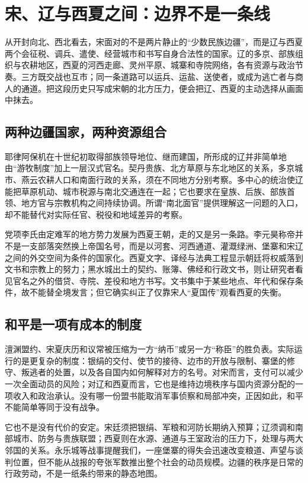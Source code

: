 \section{宋、辽与西夏之间：边界不是一条线}

从开封向北、西北看去，宋面对的不是两片静止的“少数民族边疆”，而是辽与西夏两个会征税、调兵、遣使、经营城市和书写自身合法性的国家。辽的多京、部族组织与农耕地区，西夏的河西走廊、灵州平原、城寨和寺院网络，各有资源与政治节奏。三方既交战也互市；同一条道路可以运兵、运盐、送使者，或成为逃亡者与商人的通道。把这段历史只写成宋朝的北方压力，便会把辽、西夏的主动选择从画面中抹去。

\subsection{两种边疆国家，两种资源组合}

耶律阿保机在十世纪初取得部族领导地位、继而建国，所形成的辽并非简单地由“游牧制度”加上一层汉式官名。契丹贵族、北方草原与东北地区的关系，多京城市、燕云农耕人口和南面行政的关系，须在不同地方分别考察。多中心的统治使辽能把草原机动、城市税源与南北交通连在一起；它也要求在皇族、后族、部族首领、地方官与宗教机构之间持续协调。所谓“南北面官”提供理解这一问题的入口，却不能替代对实际任官、税役和地域差异的考察。

党项李氏由定难军的地方势力发展为西夏王朝，走的又是另一条路。李元昊称帝并不是一支部落突然换上帝国名号，而是以河套、河西通道、灌溉绿洲、堡寨和宋辽之间的外交空间为条件的国家化。西夏文字、译经与法典工程显示朝廷将权威落到文书和宗教上的努力；黑水城出土的契约、账簿、佛经和行政文书，则让研究者看见官名之外的借贷、寺院、差役和地方书写。文书集中于某些地点、年代和保存条件，故不能替全境发言；但它确实纠正了仅靠宋人“夏国传”观看西夏的失衡。

\subsection{和平是一项有成本的制度}

澶渊盟约、宋夏庆历和议常被压缩为一方“纳币”或另一方“称臣”的胜负表。实际运行的是更复杂的制度：银绢的交付、使节的接待、边市的开放与限制、寨堡的修守、叛逃者的处置，以及各自国内如何解释对方的名号。对宋而言，支付可以减少一次全面动员的风险；对辽和西夏而言，它也是维持边境秩序与国内资源分配的一项收入和政治承认。没有哪一份盟书能取消军事侦察和局部冲突，正因如此，和平不能简单等同于没有战争。

它也不是没有代价的安定。宋廷须把银绢、军粮和河防长期纳入预算；辽须调和南部城市、防务与贵族联盟；西夏则在水源、通道与王室政治的压力下，处理与两大邻国的关系。永乐城等战事提醒我们，一座堡寨的得失会迅速改变粮道、声望与谈判位置，但不能从战报的夸张军数推出整个社会的动员规模。边疆的秩序是日常的行政劳动，不是一纸条约带来的静态地图。

